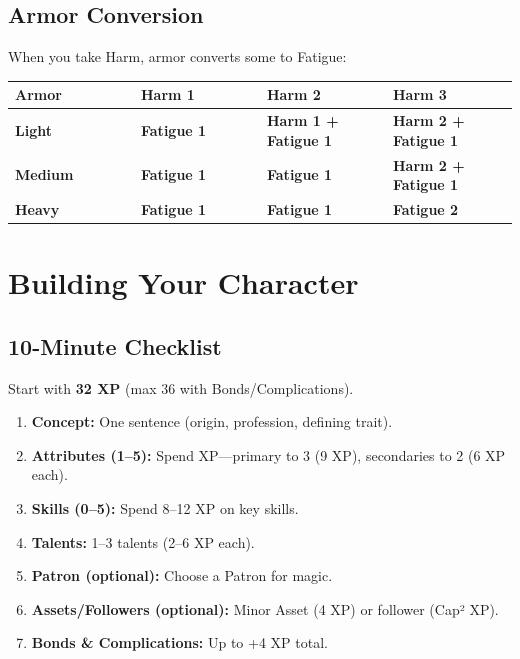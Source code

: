 \documentclass[10pt,twocolumn]{article} %
\begin{document}
\subsection{Armor Conversion}
When you take Harm, armor converts some to Fatigue:
\begin{coretable}
\begin{tabular}{>{\bfseries}p{0.25\linewidth} >{\bfseries}p{0.25\linewidth} >{\bfseries}p{0.25\linewidth} >{\bfseries}p{0.25\linewidth}}
\toprule
\textbf{Armor} & \textbf{Harm 1} & \textbf{Harm 2} & \textbf{Harm 3} \\
\midrule
Light & Fatigue 1 & Harm 1 + Fatigue 1 & Harm 2 + Fatigue 1 \\
Medium & Fatigue 1 & Fatigue 1 & Harm 2 + Fatigue 1 \\
Heavy & Fatigue 1 & Fatigue 1 & Fatigue 2 \\
\bottomrule
\end{tabular}
\end{coretable}

\section{Building Your Character}

\subsection{10-Minute Checklist}
Start with \textbf{32 XP} (max 36 with Bonds/Complications).
\begin{enumerate}[leftmargin=*]
    \item \textbf{Concept:} One sentence (origin, profession, defining trait).
    \item \textbf{Attributes (1–5):} Spend XP—primary to 3 (9 XP), secondaries to 2 (6 XP each).
    \item \textbf{Skills (0–5):} Spend 8–12 XP on key skills.
    \item \textbf{Talents:} 1–3 talents (2–6 XP each).
    \item \textbf{Patron (optional):} Choose a Patron for magic.
    \item \textbf{Assets/Followers (optional):} Minor Asset (4 XP) or follower (Cap² XP).
    \item \textbf{Bonds \& Complications:} Up to +4 XP total.
\end{enumerate}
\end{document}
